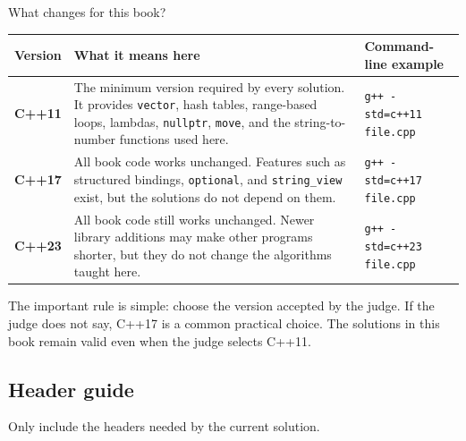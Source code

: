 \begin{revisionbox}{What changes for this book?}
\small
\setlength{\tabcolsep}{3pt}
\begin{tabularx}{\linewidth}{@{}>{\bfseries}p{1.5cm}X X@{}}
\toprule
Version & What it means here & Command-line example \\
\midrule
C++11 & The minimum version required by every solution. It provides
\texttt{vector}, hash tables, range-based loops, lambdas, \texttt{nullptr},
\texttt{move}, and the string-to-number functions used here. &
\texttt{g++ -std=c++11 file.cpp} \\
C++17 & All book code works unchanged. Features such as structured bindings,
\texttt{optional}, and \texttt{string\_view} exist, but the solutions do not
depend on them. & \texttt{g++ -std=c++17 file.cpp} \\
C++23 & All book code still works unchanged. Newer library additions may make
other programs shorter, but they do not change the algorithms taught here. &
\texttt{g++ -std=c++23 file.cpp} \\
\bottomrule
\end{tabularx}
\end{revisionbox}

The important rule is simple: choose the version accepted by the judge. If the
judge does not say, C++17 is a common practical choice. The solutions in this
book remain valid even when the judge selects C++11.

\subsection{Header guide}

Only include the headers needed by the current solution.

